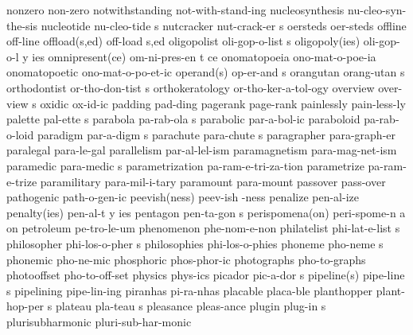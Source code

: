 \1 nonzero		non-zero		%
\1 notwithstanding	not-with-stand-ing   %
\NewWordtrue
\1 nucleosynthesis	nu-cleo-syn-the-sis	%
\5 nucleotide		nu-cleo-tide s		%
\5 nutcracker		nut-crack-er s
\1 oersteds		oer-steds
\1 offline		off-line		%
\2 offload(s,ed)	off-load s,ed		%
\5 oligopolist		oli-gop-o-list s
\3 oligopoly(ies)	oli-gop-o-l y ies
\3 omnipresent(ce)	om-ni-pres-en t ce	%
\1 onomatopoeia		ono-mat-o-poe-ia	%
\1 onomatopoetic	ono-mat-o-po-et-ic	%
\2 operand(s)		op-er-and s
\5 orangutan		orang-utan s
\5 orthodontist 	or-tho-don-tist s
\1 orthokeratology	or-tho-ker-a-tol-ogy
\5 overview		over-view s
\1 oxidic		ox-id-ic
\1 padding		pad-ding
\1 pagerank		page-rank		%
\1 painlessly		pain-less-ly
\5 palette		pal-ette s		%
\5 parabola		pa-rab-ola s
\1 parabolic		par-a-bol-ic
\1 paraboloid		pa-rab-o-loid
\5 paradigm		par-a-digm s
\5 parachute		para-chute s
\1 paragrapher		para-graph-er
\1 paralegal		para-le-gal
\1 parallelism		par-al-lel-ism
\1 paramagnetism	para-mag-net-ism
\5 paramedic		para-medic s
\1 parametrization	pa-ram-e-tri-za-tion	%
\1 parametrize		pa-ram-e-trize
\1 paramilitary 	para-mil-i-tary
\1 paramount		para-mount
\NewWordtrue
\1 passover		pass-over		%
\1 pathogenic		path-o-gen-ic
\2 peevish(ness)	peev-ish -ness
\NewWordtrue
\1 penalize		pen-al-ize		%
\3 penalty(ies)		pen-al-t y ies		%
\5 pentagon		pen-ta-gon s
\NewWordtrue
\3 perispomena(on)	peri-spome-n a on	%
\1 petroleum		pe-tro-le-um
\1 phenomenon		phe-nom-e-non
\5 philatelist		phi-lat-e-list s
\NewWordtrue
\5 philosopher		phi-los-o-pher s	%
\NewWordtrue
\1 philosophies 	phi-los-o-phies		%
\5 phoneme		pho-neme s              %
\1 phonemic		pho-ne-mic
\1 phosphoric		phos-phor-ic
\1 photographs		pho-to-graphs           %
\1 photooffset		pho-to-off-set  	%
\NewWordtrue
\1 physics		phys-ics		%
\5 picador		pic-a-dor s
\2 pipeline(s)		pipe-line s	%
\1 pipelining		pipe-lin-ing		%
\1 piranhas		pi-ra-nhas
\1 placable		placa-ble
\5 planthopper		plant-hop-per s		%
\5 plateau		pla-teau s		%
\1 pleasance		pleas-ance
\5 plugin		plug-in s		%
\NewWordtrue
\1 plurisubharmonic	pluri-sub-har-monic	%

